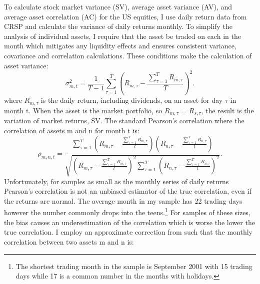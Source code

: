 To calculate stock market variance (SV), average asset variance (AV), and average asset correlation (AC) for the US equities, I use daily return data from CRSP and calculate the variance of daily returns monthly. To simplify the analysis of individual assets, I require that the asset be traded on each in the month which mitigates any liquidity effects and ensures consistent variance, covariance and correlation calculations. These conditions make the calculation of asset variance:
\begin{equation}
	\sigma^{2}_{m,t} = \frac{1}{T-1}\sum_{\tau = 1}^{T} \left(R_{m,\tau} - \frac{\sum_{\tau = 1}^{T} R_{m,\tau}}{T}\right)^{2}.
\end{equation}
where $R_{m,\tau}$ is the daily return, including dividends, on an asset for day $\tau$ in month t. When the asset is the market portfolio, so $R_{m,\tau}$ = $R_{s,\tau}$, the result is the variation of market returns, SV. The standard Pearson’s correlation where the correlation of assets m and n for month t is:
\begin{equation}
	\rho_{m,n,t} = \frac{\sum^{T}_{\tau = 1}\left(R_{m,\tau} - \frac{\sum_{\tau = 1}^{T} R_{m,\tau}}{t}\right)\left(R_{n,\tau} - \frac{\sum_{\tau = 1}^{T} R_{n,\tau}}{t}\right)}{\sqrt{\left(R_{m,\tau} - \frac{\sum_{\tau = 1}^{T} R_{m,\tau}}{t}\right)^{2}\sum_{\tau=1}^{T}\left(R_{n,\tau} - \frac{\sum_{\tau = 1}^{T} R_{n,\tau}}{t}\right)^{2} }}.
\end{equation}
Unfortunately, for samples as small as the monthly series of daily returns Pearson’s correlation is not an unbiased estimator of the true correlation, even if the returns are normal. \citep{hotelling_1953} The average month in my sample has 22 trading days however the number commonly drops into the teens.\footnote{The shortest trading month in the sample is September 2001 with 15 trading days while 17 is a common number in the months with holidays.} For samples of these sizes, the bias causes an underestimation of the correlation which is worse the lower the true correlation. I employ an approximate correction from \cite{olkin_1958} such that the monthly correlation between two assets m and n is:
